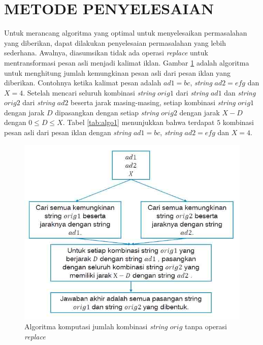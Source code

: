 \documentclass[a4paper]{IEEEtran}
\begin{document}
\section{METODE PENYELESAIAN}


Untuk merancang algoritma yang optimal untuk menyelesaikan permasalahan yang diberikan, dapat dilakukan penyelesaian permasalahan yang lebih sederhana. Awalnya, diasumsikan tidak ada operasi \textit{replace} untuk mentransformasi pesan asli menjadi kalimat iklan. Gambar \ref{figure:algo1} adalah algoritma untuk menghitung jumlah kemungkinan pesan asli dari pesan iklan yang diberikan. Contohnya ketika kalimat pesan adalah $ ad1=bc $, \textit{string} $ ad2=efg $ dan $ X=4 $. Setelah mencari seluruh kombinasi \textit{string} $ orig1 $ dari \textit{string} $ ad1 $ dan \textit{string} $ orig2 $ dari \textit{string} $ ad2 $ beserta jarak masing-masing, setiap kombinasi \textit{string} $ orig1 $ dengan jarak $ D $ dipasangkan dengan setiap \textit{string} $ orig2 $ dengan jarak $ X-D $ dengan $ 0 \le D \le X $. Tabel \ref{tab:algo1} menunjukkan bahwa terdapat $ 5 $ kombinasi pesan asli dari pesan iklan dengan \textit{string} $ ad1=bc $, \textit{string} $ ad2=efg $ dan $ X=4 $.

\begin{figure}[h]
	\centering
	\includegraphics[width=\linewidth]{images/algo1.jpg}
	\caption{Algoritma komputasi jumlah kombinasi \textit{string} $ orig $ tanpa operasi \textit{replace}}
	\label{figure:algo1}
\end{figure}
\end{document}
